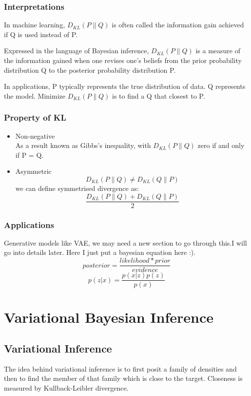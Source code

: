 \documentclass{article}
\begin{document}
\subsubsection{Interpretations}
In machine learning, $D_{KL}(P \parallel Q)$ is often called the information gain achieved if Q is used instead of P.


Expressed in the language of Bayesian inference, $D_{KL}(P \parallel Q)$ is a measure of the information gained when one revises one's beliefs from the prior probability distribution Q to the posterior probability distribution P.

In applications, P typically represents the true distribution of data. Q represents the model. Minimize $D_{KL}(P \parallel Q)$ is to find a Q that closest to P.  
\subsubsection{Property of KL}
\begin{itemize}
\item Non-negative \\
As a result known as Gibbs's inequality, with $D_{KL}(P \parallel Q)$ zero if and only if P = Q.
\item Asymmetric
$$D_{KL}(P \parallel Q) \neq D_{KL}(Q \parallel P)$$
we can define symmetrised divergence as:
$$\frac{D_{KL}(P \parallel Q) + D_{KL}(Q \parallel P)}{2}$$
\end{itemize}
\subsubsection{Applications}
Generative models like VAE, we may need a new section to go through this.I will go into details later. Here I just put a bayesian equation here :). 
$$posterior=\frac{likelihood * prior}{evidence}$$
$$p(z|x)=\frac{p(x|z)p(z)}{p(x)}$$

\section{Variational Bayesian Inference}
\subsection{Variational Inference}
The idea behind variational inference is to first posit a family of densities and then
to find the member of that family which is close to the target. Closeness is measured
by Kullback-Leibler divergence.
\end{document}
